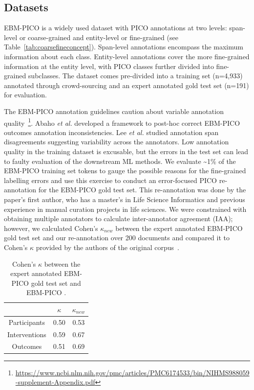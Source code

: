 \documentclass[10.7pt,]{article}
\begin{document}
\subsection{Datasets}\label{data}
%
EBM-PICO is a widely used dataset with PICO annotations at two levels: span-level or coarse-grained and entity-level or fine-grained (see Table~\ref{tab:coarsefineconcept}).
Span-level annotations encompass the maximum information about each class.
Entity-level annotations cover the more fine-grained information at the entity level, with PICO classes further divided into fine-grained subclasses.
The dataset comes pre-divided into a training set (n=4,933) annotated through crowd-sourcing and an expert annotated gold test set (n=191) for evaluation.~\cite{nye2018corpus}

The EBM-PICO annotation guidelines caution about variable annotation quality~\footnote{\url{https://www.ncbi.nlm.nih.gov/pmc/articles/PMC6174533/bin/NIHMS988059-supplement-Appendix.pdf}}.
Abaho \textit{et al.} developed a framework to post-hoc correct EBM-PICO outcomes annotation inconsistencies\cite{abaho2019correcting}.
Lee \textit{et al.} studied annotation span disagreements suggesting variability across the annotators.\cite{lee2019study}
Low annotation quality in the training dataset is excusable, but the errors in the test set can lead to faulty evaluation of the downstream ML methods.
We evaluate \textasciitilde1\% of the EBM-PICO training set tokens to gauge the possible reasons for the fine-grained labelling errors and use this exercise to conduct an error-focused PICO re-annotation for the EBM-PICO gold test set.
This re-annotation was done by the paper's first author, who has a master's in Life Science Informatics and previous experience in manual curation projects in life sciences.
We were constrained with obtaining multiple annotators to calculate inter-annotator agreement (IAA); however, we calculated Cohen's $\kappa_{new}$ between the expert annotated EBM-PICO gold test set and our re-annotation over 200 documents and compared it to Cohen's $\kappa$ provided by the authors of the original corpus~\cite{nye2018corpus}.
%
\begin{table}[h!]
\begin{center}
\begin{tabular}{| c | c | c |} 
\hline
 & $\kappa$ & $\kappa_{new}$ \\ 
\hline
Participants & 0.50 & 0.53  \\ 
Interventions & 0.59 & 0.67 \\ 
Outcomes & 0.51 & 0.69  \\
\hline
\end{tabular}
\caption{\label{tab:agreement} Cohen's $\kappa$ between the expert annotated EBM-PICO gold test set and EBM-PICO .}
\end{center}
\end{table}
%
\end{document}
